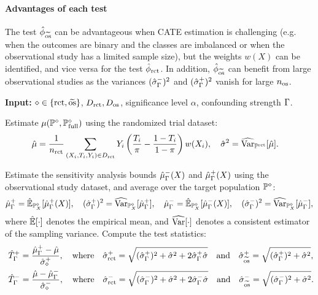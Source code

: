 \paragraph{Advantages of each test} The test $\hat{\phi}_{\widetilde{\mathrm{os}}}$ can be advantageous when CATE estimation is challenging (e.g. when the outcomes are binary and the classes are imbalanced or when the observational study has a limited sample size), but the weights $w(X)$ can be identified, and vice versa for the test $\hat{\phi}_{\mathrm{rct}}$. In addition, $\hat{\phi}_{\widetilde{\mathrm{os}}}$ can benefit from large observational studies as the variances $(\hat{\sigma}_\Gamma^-)^2$ and $(\hat{\sigma}_\Gamma^+)^2$ vanish for large $n_{\operatorname{os}}$.
\vspace{-2mm}
\begin{algorithm*}[t]
\caption{Statistical test for detecting unobserved confounding}
\begin{algorithmic}[1]
\State \textbf{Input:}  $\diamond \in \{\mathrm{rct},\widetilde{\mathrm{os}}\}$, $D_{\operatorname{rct}},D_{\mathrm{os}}$, significance level $\alpha$, confounding strength $\Gamma$.



\State Estimate $\mu(\mathbb{P} ^{\diamond}, \mathbb{P} ^{\diamond}_{\operatorname{full}})$ using the randomized trial dataset:  \begin{align*}\hat{\mu} &=  \frac{1}{n_{\operatorname{rct}}}\sum_{\substack{(X_i,T_i,Y_i)  \in D_{\operatorname{rct}}}} Y_i\left(\frac{T_i}{\pi} - \frac{1-T_i}{1-\pi}  \right)w(X_i), 
\quad \hat{\sigma}^2 = \widehat{\operatorname{Var}}_{\mathbb{P}^{\operatorname{rct}}}[\hat{\mu}].
\end{align*} 

\State Estimate the sensitivity analysis bounds $\hat{\mu}^{-}_\Gamma(X)$ and $\hat{\mu}^{+}_\Gamma(X)$ using the observational study dataset, and average over the target population $\mathbb{P} ^{\diamond}$:$$
\hat{\mu}_\Gamma^+ =
  \hat{\mathbb{E}}_{\mathbb{P} ^{\diamond}_X}[ \hat{\mu}^{+}_\Gamma(X)], \quad (\hat{\sigma}^+_\Gamma)^2 = \widehat{\operatorname{Var}}_{\mathbb{P} ^{\diamond}_X}[\hat{\mu}_\Gamma^+], \quad   \hat{\mu}_\Gamma^- = \hat{\mathbb{E}}_{\mathbb{P} ^{\diamond}_X}[ \hat{\mu}^{-}_\Gamma(X)], \quad (\hat{\sigma}^-_\Gamma)^2 = \widehat{\operatorname{Var}}_{\mathbb{P} ^{\diamond}_X}[\hat{\mu}_\Gamma^-],
$$
where $\hat{\mathbb{E}}[\cdot]$ denotes the empirical mean, and $\widehat{\operatorname{Var}}[\cdot]$ denotes a consistent estimator of the sampling variance. 
\State Compute the test statistics: 
\begin{align*}  &\hat{T}_{\Gamma}^+= \frac{\hat{\mu}^{+}_\Gamma - \hat{\mu}}{\hat{\sigma}^+_{\diamond}} , \quad \mathrm{where} \quad  \hat{\sigma}^+_{\mathrm{rct}} =\sqrt{(\hat{\sigma}^+_\Gamma)^2 +\hat{\sigma}^2 + 2 \hat{\sigma}_\Gamma^+ \hat{\sigma} } \quad \mathrm{and}\quad \hat{\sigma}^+_{\widetilde{\mathrm{os}}} =\sqrt{(\hat{\sigma}^+_\Gamma)^2 +\hat{\sigma}^2},
\\\ &\hat{T}_{\Gamma}^- =  \frac{ \hat{\mu}- \hat{\mu}^{-}_\Gamma}{\hat{\sigma}^-_{\diamond}},\quad \mathrm{where} \quad  \hat{\sigma}^-_{\mathrm{rct}} =\sqrt{(\hat{\sigma}^-_\Gamma)^2 +\hat{\sigma}^2 + 2 \hat{\sigma}_\Gamma^- \hat{\sigma} } \quad \mathrm{and}\quad \hat{\sigma}^-_{\widetilde{\mathrm{os}}} =\sqrt{(\hat{\sigma}^-_\Gamma)^2 +\hat{\sigma}^2}.\end{align*}



\end{algorithmic}
\end{algorithm*}
